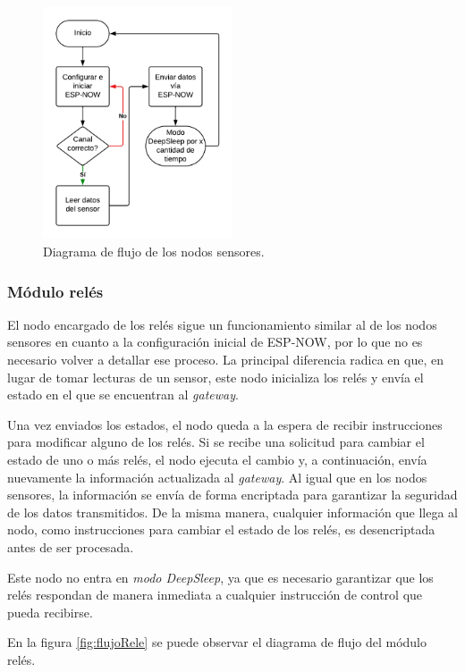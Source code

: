 \begin{figure}[H]
\centering 
\includegraphics[width=0.5\textwidth]{./Figures/flujo_nodo_sensor.png}
\caption{Diagrama de flujo de los nodos sensores.}
\label{fig:flujoSensor}
\end{figure}

\subsubsection{Módulo relés}

El nodo encargado de los relés sigue un funcionamiento similar al de los nodos sensores en cuanto a la configuración inicial de ESP-NOW, por lo que no es necesario volver a detallar ese proceso. La principal diferencia radica en que, en lugar de tomar lecturas de un sensor, este nodo inicializa los relés y envía el estado en el que se encuentran al \textit{gateway}.

Una vez enviados los estados, el nodo queda a la espera de recibir instrucciones para modificar alguno de los relés. Si se recibe una solicitud para cambiar el estado de uno o más relés, el nodo ejecuta el cambio y, a continuación, envía nuevamente la información actualizada al \textit{gateway}.
Al igual que en los nodos sensores, la información se envía de forma encriptada para garantizar la seguridad de los datos transmitidos. De la misma manera, cualquier información que llega al nodo, como instrucciones para cambiar el estado de los relés, es desencriptada antes de ser procesada.

Este nodo no entra en \textit{modo DeepSleep}, ya que es necesario garantizar que los relés respondan de manera inmediata a cualquier instrucción de control que pueda recibirse.

En la figura \ref{fig:flujoRele} se puede observar el diagrama de flujo del módulo relés. 


